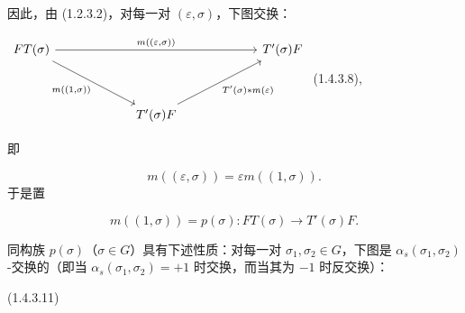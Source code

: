 \clearpage
{}%
因此，由 (1.2.3.2)，对每一对 $(\varepsilon,\sigma)$，下图交换：

\begin{center}
  $\begin{tikzcd}[ampersand replacement=\&,column sep=6em,row sep=3.5em]
    FT(\sigma)
      \arrow[rr,"{m((\varepsilon,\sigma))}"]
      \arrow[dr,"{m((1,\sigma))}"']
      \& \& T'(\sigma)F \\
      \& T'(\sigma)F
        \arrow[ur,"{T'(\sigma)*m(\varepsilon)}"'] \&
  \end{tikzcd}$
  \hfill\textup{(1.4.3.8)},
\end{center}

\noindent 即

\begin{equation}
  m((\varepsilon,\sigma))=\varepsilon m((1,\sigma)).
  \tag{1.4.3.9}
\end{equation}
于是置

\begin{equation}
  m((1,\sigma))=p(\sigma)\colon
  FT(\sigma)\longrightarrow T'(\sigma)F.
  \tag{1.4.3.10}
\end{equation}

同构族 $p(\sigma)$（$\sigma\in G$）具有下述性质：对每一对
$\sigma_1,\sigma_2\in G$，下图是
$\alpha_s(\sigma_1,\sigma_2)$-交换的（即当
$\alpha_s(\sigma_1,\sigma_2)=+1$ 时交换，而当其为 $-1$ 时反交换）：

\begin{center}
  \hfill\textup{(1.4.3.11)}
\end{center}

